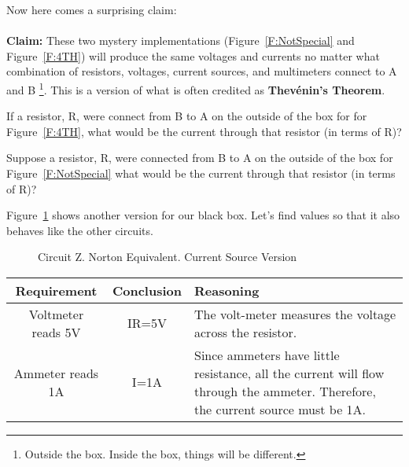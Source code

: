 Now here comes a surprising claim:\\
\\
\noindent
\textbf{Claim:} These two mystery implementations (Figure~\ref{F:NotSpecial} and Figure~\ref{F:4TH}) will produce the same voltages and currents no matter what combination of resistors, voltages, current sources, and multimeters connect to A and B \footnote{Outside the box. Inside the box, things will be different.}. This is a version of what is often credited as \textbf{Thev\'enin's Theorem}.

\begin{alevel}
If a resistor, R, were connect from B to A on the outside of the box for for Figure~\ref{F:4TH}, what would be the current through that resistor (in terms of R)?
\end{alevel}

\begin{clevel}
Suppose a resistor, R, were connected from B to A on the outside of the box for Figure~\ref{F:NotSpecial} what would be the current through that resistor (in terms of R)?
\end{clevel}

Figure~\ref{F:4NOR} shows another version for our black box. Let's find values so that it also behaves like the other circuits.

\begin{figure}[H]
\begin{center}
\caption{Circuit Z. Norton Equivalent. Current Source Version}
\label{F:4NOR}
\end{center}
\end{figure}

\begin{table}[H]
\begin{center}
\begin{tabular}{|c|c|p{60mm}|} \hline
Requirement & Conclusion & Reasoning \\ \hline
Voltmeter reads 5V & IR=5V & The volt-meter measures the voltage across the resistor. \\ \hline
Ammeter reads 1A & I=1A	& Since ammeters have little resistance, all the current will flow through the ammeter. Therefore, the current source must be 1A. \\ \hline
\end{tabular}
\end{center}
\end{table}

